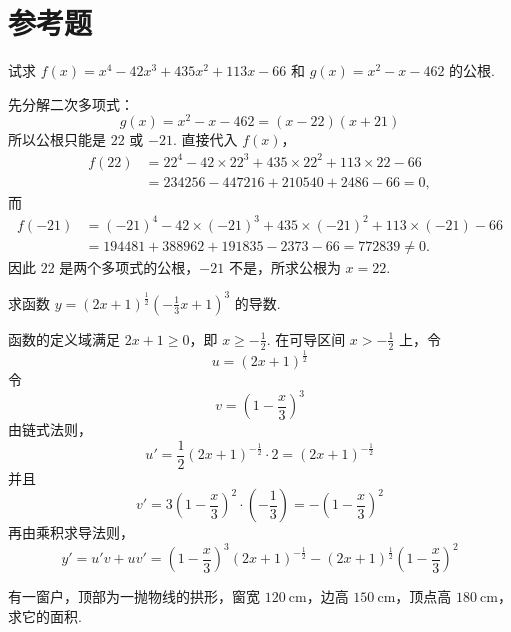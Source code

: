 \section{参考题}

\begin{problem}
试求 \(f(x)=x^4-42x^3+435x^2+113x-66\) 和 \(g(x)=x^2-x-462\) 的公根.
\end{problem}

\begin{solution}
先分解二次多项式：
\[
g(x)=x^2-x-462=(x-22)(x+21)
\]
所以公根只能是 \(22\) 或 \(-21\). 直接代入 \(f(x)\)，
\[
\begin{aligned}
f(22)&=22^4-42\times22^3+435\times22^2+113\times22-66\\
&=234256-447216+210540+2486-66=0,
\end{aligned}
\]
而
\[
\begin{aligned}
f(-21)&=(-21)^4-42\times(-21)^3+435\times(-21)^2+113\times(-21)-66\\
&=194481+388962+191835-2373-66=772839\neq 0.
\end{aligned}
\]
因此 \(22\) 是两个多项式的公根，\(-21\) 不是，所求公根为 \(x=22\).
\end{solution}

\begin{problem}
求函数 \(y=\left(2x+1\right)^{\frac{1}{2}}\left(-\frac{1}{3}x+1\right)^3\) 的导数.
\end{problem}

\begin{solution}
函数的定义域满足 \(2x+1\geq 0\)，即 \(x\geq-\frac{1}{2}\). 在可导区间 \(x>-\frac{1}{2}\) 上，令
\[
u=\left(2x+1\right)^{\frac{1}{2}}
\]
令
\[
v=\left(1-\frac{x}{3}\right)^3
\]
由链式法则，
\[
u'=\frac{1}{2}\left(2x+1\right)^{-\frac{1}{2}}\cdot 2=\left(2x+1\right)^{-\frac{1}{2}}
\]
并且
\[
v'=3\left(1-\frac{x}{3}\right)^2\cdot\left(-\frac{1}{3}\right)=-\left(1-\frac{x}{3}\right)^2
\]
再由乘积求导法则，
\[
y'=u'v+uv'
=\left(1-\frac{x}{3}\right)^3\left(2x+1\right)^{-\frac{1}{2}}-\left(2x+1\right)^{\frac{1}{2}}\left(1-\frac{x}{3}\right)^2
\]
\end{solution}

\begin{problem}
有一窗户，顶部为一抛物线的拱形，窗宽 \(120\mathrm{~cm}\)，边高 \(150\mathrm{~cm}\)，顶点高 \(180\mathrm{~cm}\)，求它的面积.
\end{problem}

